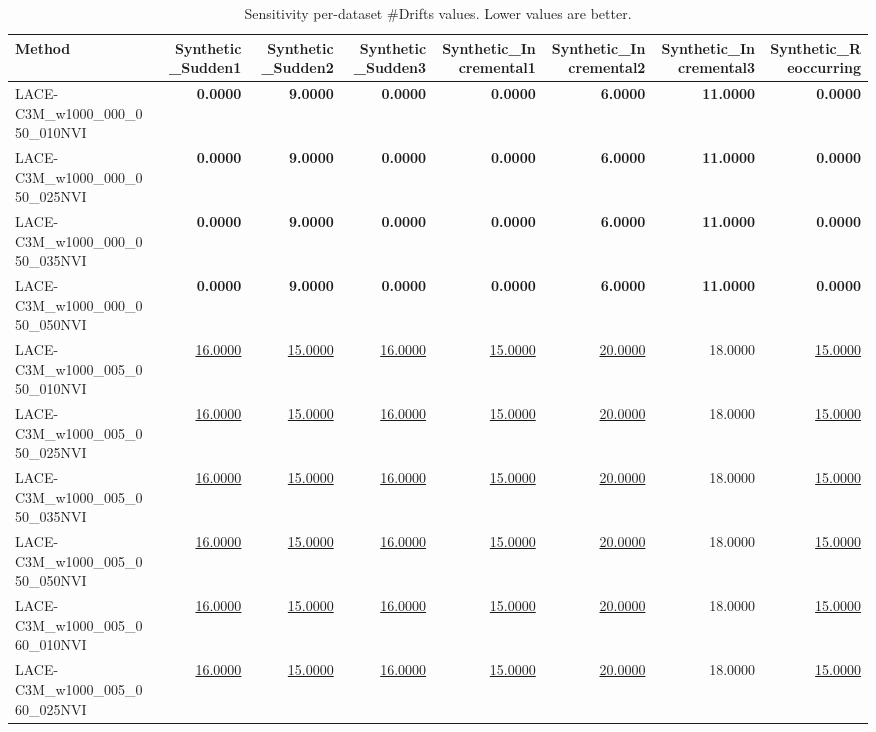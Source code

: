 \begin{table}
\caption{Sensitivity per-dataset \#Drifts values. Lower values are better.}
\label{tab:per-data-sensitivity-n-drifts-detected}
\begin{tabular}{lrrrrrrr}
\toprule
Method & Synthetic\_Sudden1 & Synthetic\_Sudden2 & Synthetic\_Sudden3 & Synthetic\_Incremental1 & Synthetic\_Incremental2 & Synthetic\_Incremental3 & Synthetic\_Reoccurring \\
\midrule
LACE-C3M\_w1000\_000\_050\_010NVI & \textbf{0.0000} & \textbf{9.0000} & \textbf{0.0000} & \textbf{0.0000} & \textbf{6.0000} & \textbf{11.0000} & \textbf{0.0000} \\
LACE-C3M\_w1000\_000\_050\_025NVI & \textbf{0.0000} & \textbf{9.0000} & \textbf{0.0000} & \textbf{0.0000} & \textbf{6.0000} & \textbf{11.0000} & \textbf{0.0000} \\
LACE-C3M\_w1000\_000\_050\_035NVI & \textbf{0.0000} & \textbf{9.0000} & \textbf{0.0000} & \textbf{0.0000} & \textbf{6.0000} & \textbf{11.0000} & \textbf{0.0000} \\
LACE-C3M\_w1000\_000\_050\_050NVI & \textbf{0.0000} & \textbf{9.0000} & \textbf{0.0000} & \textbf{0.0000} & \textbf{6.0000} & \textbf{11.0000} & \textbf{0.0000} \\
LACE-C3M\_w1000\_005\_050\_010NVI & \underline{16.0000} & \underline{15.0000} & \underline{16.0000} & \underline{15.0000} & \underline{20.0000} & 18.0000 & \underline{15.0000} \\
LACE-C3M\_w1000\_005\_050\_025NVI & \underline{16.0000} & \underline{15.0000} & \underline{16.0000} & \underline{15.0000} & \underline{20.0000} & 18.0000 & \underline{15.0000} \\
LACE-C3M\_w1000\_005\_050\_035NVI & \underline{16.0000} & \underline{15.0000} & \underline{16.0000} & \underline{15.0000} & \underline{20.0000} & 18.0000 & \underline{15.0000} \\
LACE-C3M\_w1000\_005\_050\_050NVI & \underline{16.0000} & \underline{15.0000} & \underline{16.0000} & \underline{15.0000} & \underline{20.0000} & 18.0000 & \underline{15.0000} \\
LACE-C3M\_w1000\_005\_060\_010NVI & \underline{16.0000} & \underline{15.0000} & \underline{16.0000} & \underline{15.0000} & \underline{20.0000} & 18.0000 & \underline{15.0000} \\
LACE-C3M\_w1000\_005\_060\_025NVI & \underline{16.0000} & \underline{15.0000} & \underline{16.0000} & \underline{15.0000} & \underline{20.0000} & 18.0000 & \underline{15.0000} \\

\end{tabular}
\end{table}
